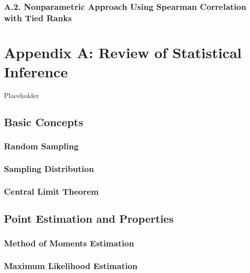 \documentclass[]{book}
\theoremstyle{definition}
\theoremstyle{definition}
\theoremstyle{definition}
\theoremstyle{remark}
\begin{document}
\subsection*{A.2. Nonparametric Approach Using Spearman Correlation with
Tied
Ranks}\label{a.2.-nonparametric-approach-using-spearman-correlation-with-tied-ranks}

\chapter{Appendix A: Review of Statistical Inference}\label{C:AppA}

Placeholder

\section{Basic Concepts}\label{S:AppA:BASIC}

\subsection{Random Sampling}\label{random-sampling}

\subsection{Sampling Distribution}\label{sampling-distribution}

\subsection{Central Limit Theorem}\label{central-limit-theorem}

\section{Point Estimation and Properties}\label{S:AppA:PE}

\subsection{Method of Moments
Estimation}\label{method-of-moments-estimation}

\subsection{Maximum Likelihood
Estimation}\label{maximum-likelihood-estimation}
\end{document}
